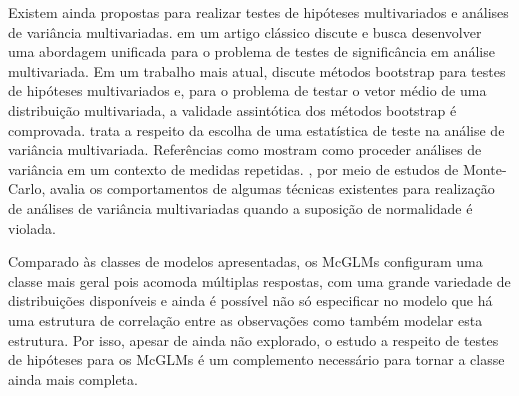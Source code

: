 
Existem ainda propostas para realizar testes de hipóteses multivariados e análises de variância multivariadas. \citet{rao1948tests} em um artigo clássico discute e busca desenvolver uma abordagem unificada para o problema de testes de significância em análise multivariada. Em um trabalho mais atual, \citet{smaga2017bootstrap} discute métodos bootstrap para testes de hipóteses multivariados e, para o problema de testar o vetor médio de uma distribuição multivariada, a validade assintótica dos métodos bootstrap é comprovada. \citet{olson1976choosing} trata a respeito da escolha de uma estatística de teste na análise de variância multivariada. Referências como \citet{hand1987multivariate} mostram como proceder análises de variância em um contexto de medidas repetidas. \citet{adeleke2014comparison}, por meio de estudos de Monte-Carlo, avalia os comportamentos de algumas técnicas existentes para realização de análises de variância multivariadas quando a suposição de normalidade é violada.


Comparado às classes de modelos apresentadas, os McGLMs configuram uma classe mais geral pois acomoda múltiplas respostas, com uma grande variedade de distribuições disponíveis e ainda é possível não só especificar no modelo que há uma estrutura de correlação entre as observações como também modelar esta estrutura. Por isso, apesar de ainda não explorado, o estudo a respeito de testes de hipóteses para os McGLMs é um complemento necessário para tornar a classe ainda mais completa.


